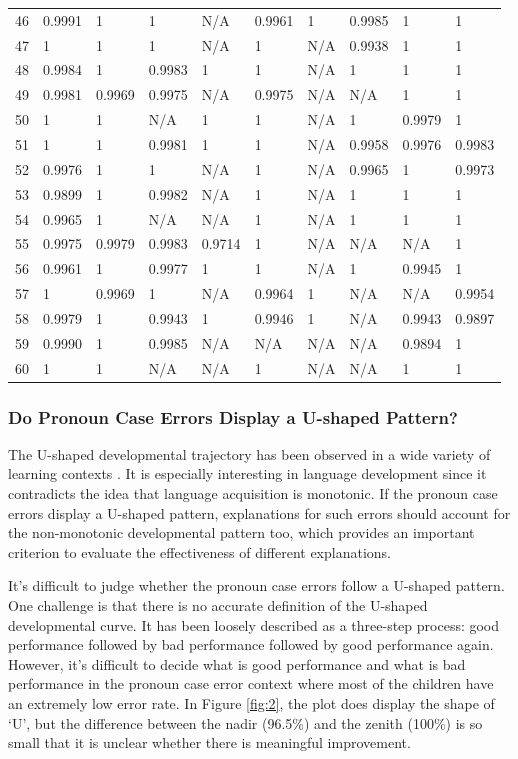 \begin{table}[h]
\begin{tabular}{c|lllllllll}
46 & 0.9991 & 1 & 1 & N/A & 0.9961 & 1 & 0.9985 & 1 & 1 \\
47 & 1 & 1 & 1 & N/A & 1 & N/A & 0.9938 & 1 & 1 \\
48 & 0.9984 & 1 & 0.9983 & 1 & 1 & N/A & 1 & 1 & 1 \\
49 & 0.9981 & 0.9969 & 0.9975 & N/A & 0.9975 & N/A & N/A & 1 & 1 \\
50 & 1 & 1 & N/A & 1 & 1 & N/A & 1 & 0.9979 & 1 \\
51 & 1 & 1 & 0.9981 & 1 & 1 & N/A & 0.9958 & 0.9976 & 0.9983 \\
52 & 0.9976 & 1 & 1 & N/A & 1 & N/A & 0.9965 & 1 & 0.9973 \\
53 & 0.9899 & 1 & 0.9982 & N/A & 1 & N/A & 1 & 1 & 1 \\
54 & 0.9965 & 1 & N/A & N/A & 1 & N/A & 1 & 1 & 1 \\
55 & 0.9975 & 0.9979 & 0.9983 & 0.9714 & 1 & N/A & N/A & N/A & 1 \\
56 & 0.9961 & 1 & 0.9977 & 1 & 1 & N/A & 1 & 0.9945 & 1 \\
57 & 1 & 0.9969 & 1 & N/A & 0.9964 & 1 & N/A & N/A & 0.9954 \\
58 & 0.9979 & 1 & 0.9943 & 1 & 0.9946 & 1 & N/A & 0.9943 & 0.9897 \\
59 & 0.9990 & 1 & 0.9985 & N/A & N/A & N/A & N/A & 0.9894 & 1 \\
60 & 1 & 1 & N/A & N/A & 1 & N/A & N/A & 1 & 1 \\ 
\bottomrule
\end{tabular}
\end{table}
\FloatBarrier

\subsubsection{Do Pronoun Case Errors Display a U-shaped Pattern?}
The U-shaped developmental trajectory has been observed in a wide variety of learning contexts \citep[for a review, see][]{siegler2004u}. It is especially interesting in language development since it contradicts the idea that language acquisition is monotonic. If the pronoun case errors display a U-shaped pattern, explanations for such errors should account for the non-monotonic developmental pattern too, which provides an important criterion to evaluate the effectiveness of different explanations. 

It's difficult to judge whether the pronoun case errors follow a U-shaped pattern. One challenge is that there is no accurate definition of the U-shaped developmental curve. It has been loosely described as a three-step process: good performance followed by bad performance followed by good performance again. However, it's difficult to decide what is good performance and what is bad performance in the pronoun case error context where most of the children have an extremely low error rate. In Figure \ref{fig:2}, the plot does display the shape of `U', but the difference between the nadir (96.5\%) and the zenith (100\%) is so small that it is unclear whether there is meaningful improvement.

